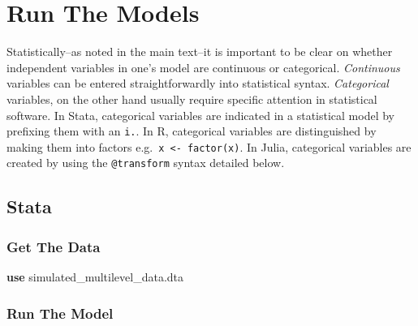 \documentclass[
  letterpaper,
  DIV=11,
  numbers=noendperiod]{scrreprt}
\newenvironment{Shaded}{\begin{snugshade}}{\end{snugshade}}
\newcommand{\KeywordTok}[1]{\textcolor[rgb]{0.00,0.23,0.31}{\textbf{#1}}}
\newcommand{\NormalTok}[1]{\textcolor[rgb]{0.00,0.23,0.31}{#1}}
\begin{document}
\section{Run The Models}\label{run-the-models}

\begin{tcolorbox}[enhanced jigsaw, colbacktitle=quarto-callout-warning-color!10!white, toprule=.15mm, leftrule=.75mm, opacitybacktitle=0.6, left=2mm, title=\textcolor{quarto-callout-warning-color}{\faExclamationTriangle}\hspace{0.5em}{Continuous and Categorical Variables}, bottomtitle=1mm, breakable, toptitle=1mm, titlerule=0mm, colframe=quarto-callout-warning-color-frame, arc=.35mm, rightrule=.15mm, opacityback=0, bottomrule=.15mm, colback=white, coltitle=black]

Statistically--as noted in the main text--it is important to be clear on
whether independent variables in one's model are continuous or
categorical. \emph{Continuous} variables can be entered
straightforwardly into statistical syntax. \emph{Categorical} variables,
on the other hand usually require specific attention in statistical
software. In Stata, categorical variables are indicated in a statistical
model by prefixing them with an \texttt{i.}. In R, categorical variables
are distinguished by making them into factors
e.g.~\texttt{x\ \textless{}-\ factor(x)}. In Julia, categorical
variables are created by using the \texttt{@transform} syntax detailed
below.

\end{tcolorbox}

\subsection{Stata}

\subsubsection{Get The Data}\label{get-the-data}

\begin{Shaded}
\begin{Highlighting}[]

\KeywordTok{use}\NormalTok{ simulated\_multilevel\_data.dta}
\end{Highlighting}
\end{Shaded}

\subsubsection{Run The Model}\label{run-the-model}
\end{document}

